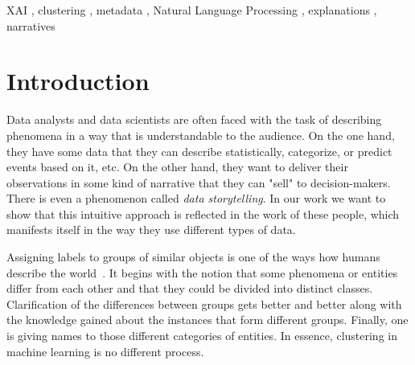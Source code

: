 \documentclass[
 twocolumn,
 hf,
]{ceurart}
\begin{document}
\begin{keywords}
  XAI \sep
  clustering \sep
  metadata \sep
  Natural Language Processing \sep
  explanations \sep
  narratives
\end{keywords}

\maketitle

\section{Introduction}\label{sec:introduction}
Data analysts and data scientists are often faced with the task of describing phenomena in a way that is understandable to the audience.
On the one hand, they have some data that they can describe statistically, categorize, or predict events based on it, etc.
On the other hand, they want to deliver their observations in some kind of narrative that they can "sell" to decision-makers.
There is even a phenomenon called \textit{data storytelling}.
In our work we want to show that this intuitive approach is reflected in the work of these people, which manifests itself in the way they use different types of data.

Assigning labels to groups of similar objects is one of the ways how humans describe the world~\cite{Rosch1978-ROSCAC-5}.
It begins with the notion that some phenomena or entities differ from each other and that they could be divided into distinct classes.
Clarification of the differences between groups gets better and better along with the knowledge gained about the instances that form different groups.
Finally, one is giving names to those different categories of entities. %
In essence, clustering in machine learning is no different process.
\end{document}
